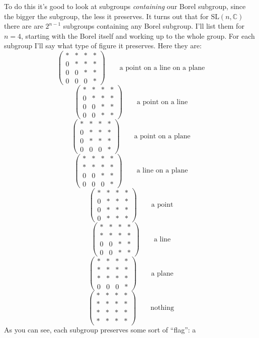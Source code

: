 \documentclass{article}
\begin{document}
To do this it's good to look at subgroups \emph{containing} our Borel
subgroup, since the bigger the subgroup, the less it preserves. It turns
out that for \(\mathrm{SL}(n,\mathbb{C})\) there are are \(2^{n-1}\)
subgroups containing any Borel subgroup. I'll list them for \(n = 4\),
starting with the Borel itself and working up to the whole group. For
each subgroup I'll say what type of figure it preserves. Here they are:
\[
  \left(
    \begin{array}{cccc}
      *&*&*&*
    \\0&*&*&*
    \\0&0&*&*
    \\0&0&0&*
    \end{array}
  \right)
  \qquad\text{a point on a line on a plane}
\] \[
  \left(
    \begin{array}{cccc}
      *&*&*&*
    \\0&*&*&*
    \\0&0&*&*
    \\0&0&*&*
    \end{array}
  \right)
  \qquad\text{a point on a line}
\] \[
  \left(
    \begin{array}{cccc}
      *&*&*&*
    \\0&*&*&*
    \\0&*&*&*
    \\0&0&0&*
    \end{array}
  \right)
  \qquad\text{a point on a plane}
\] \[
  \left(
    \begin{array}{cccc}
      *&*&*&*
    \\*&*&*&*
    \\0&0&*&*
    \\0&0&0&*
    \end{array}
  \right)
  \qquad\text{a line on a plane}
\] \[
  \left(
    \begin{array}{cccc}
      *&*&*&*
    \\0&*&*&*
    \\0&*&*&*
    \\0&*&*&*
    \end{array}
  \right)
  \qquad\text{a point}
\] \[
  \left(
    \begin{array}{cccc}
      *&*&*&*
    \\*&*&*&*
    \\0&0&*&*
    \\0&0&*&*
    \end{array}
  \right)
  \qquad\text{a line}
\] \[
  \left(
    \begin{array}{cccc}
      *&*&*&*
    \\*&*&*&*
    \\*&*&*&*
    \\0&0&0&*
    \end{array}
  \right)
  \qquad\text{a plane}
\] \[
  \left(
    \begin{array}{cccc}
      *&*&*&*
    \\*&*&*&*
    \\*&*&*&*
    \\*&*&*&*
    \end{array}
  \right)
  \qquad\text{nothing}
\] As you can see, each subgroup preserves some sort of ``flag'': a
\end{document}
